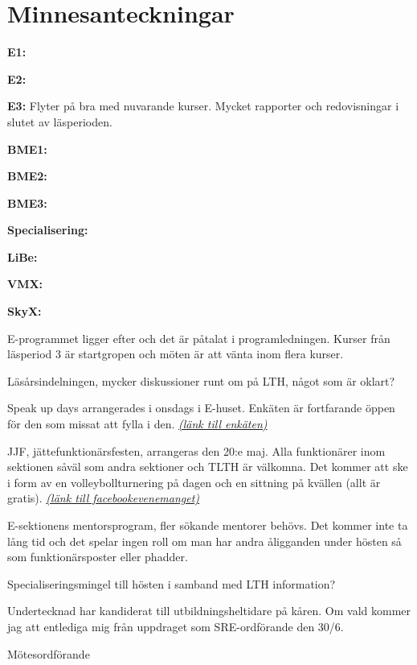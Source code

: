 \documentclass[10pt]{article}
\def\mo{Pontus Landgren}
\begin{document}
\section*{Minnesanteckningar}
\begin{paragrafer}
\textbf{E1:}

\textbf{E2:}

\textbf{E3:} Flyter på bra med nuvarande kurser. Mycket rapporter och redovisningar i slutet av läsperioden.

\textbf{BME1:}

\textbf{BME2:}
 
\textbf{BME3:}
 
\textbf{Specialisering:} 

\textbf{LiBe:} %

\textbf{VMX:} %

\textbf{SkyX:} %

 E-programmet ligger efter och det är påtalat i programledningen. Kurser från läsperiod 3 är startgropen och möten är att vänta inom flera kurser.

\item{Läsårsindelningen, mycker diskussioner runt om på LTH, något som är oklart?}

\item{Speak up days arrangerades i onsdags i E-huset. Enkäten är fortfarande öppen för den som missat att fylla i den. \textit{\href{https://www.tinyurl.com/sud17}{(länk till enkäten)}}}

\item{JJF, jättefunktionärsfesten, arrangeras den 20:e maj. Alla funktionärer inom sektionen såväl som andra sektioner och TLTH är välkomna. Det kommer att ske i form av en volleybollturnering på dagen och en sittning på kvällen (allt är gratis). \textit{\href{https://www.facebook.com/events/1325332067532352/}{(länk till facebookevenemanget)}}}

\item{E-sektionens mentorsprogram, fler sökande mentorer behövs. Det kommer inte ta lång tid och det spelar ingen roll om man har andra åligganden under hösten så som funktionärsposter eller phadder.}

\item{Specialiseringsmingel till hösten i samband med LTH information?}

Undertecknad har kandiderat till utbildningsheltidare på kåren. Om vald kommer jag att entlediga mig från uppdraget som SRE-ordförande den 30/6.

\end{paragrafer}

\hidesignfoot
\begin{signatures}{1}
\signature{\mo}{Mötesordförande}
\end{signatures}
\end{document}
